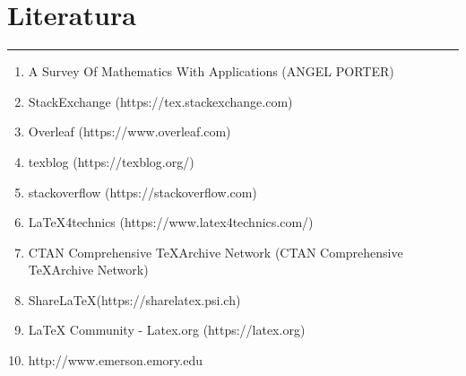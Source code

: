 \documentclass[a4paper,14pt,svgnames]{article}
\begin{document}
\newpage
\section*{\textbf{Literatura}}
\hrule
\bigskip\bigskip
\large
\begin{enumerate}
\item A Survey Of Mathematics With Applications (ANGEL PORTER)
\item StackExchange (https://tex.stackexchange.com)
\item Overleaf (https://www.overleaf.com)
\item texblog (https://texblog.org/)
\item stackoverflow (https://stackoverflow.com)
\item \LaTeX 4technics (https://www.latex4technics.com/)
\item CTAN Comprehensive \TeX Archive Network (CTAN Comprehensive \TeX Archive Network)
\item Share\LaTeX (https://sharelatex.psi.ch)
\item LaTeX Community - Latex.org (https://latex.org)
\item http://www.emerson.emory.edu
\end{enumerate}

\end{document}
